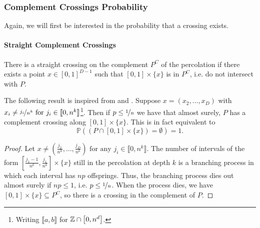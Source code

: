 \subsubsection{Complement Crossings Probability}
Again, we will first be interested in the probability that a crossing exists.

\paragraph{Straight Complement Crossings}
There is a straight crossing on the complement $P^C$ of the percolation if there exists a point $x \in \left[ 0,1 \right]^{D-1}$ such that $\left[ 0,1 \right] \times \{ x \}$  is in $P^C$, i.e. do not intersect with $P$.

The following result is inspired from \cite[p.309 b.(1)]{Chayes_1988} and \cite[p.215]{Mandelbrot_1982}.
Suppose $x = (x_2,\dots,x_D)$ with $x_i \neq \nicefrac{j_i}{n^k} \text{ for } j_i \in \llbracket 0,n^k \rrbracket$\footnote{Writing $\llbracket a,b \rrbracket$ for $\mathbb{Z} \cap \left[ 0,n^d \right]$.}.
Then if $p \leq \nicefrac{1}{n}$ we have that almost surely, $P$ has a complement crossing along $\left[ 0,1 \right] \times \{ x \}$.
This is in fact equivalent to 
$$\mathbb{P}\left( \left( P \cap \left[ 0,1 \right] \times \{ x \} \right) = \emptyset \right) = 1 .$$
\begin{proof}
	Let $x \neq \left( \frac{j_2}{n^k},\dots,\frac{j_D}{n^k} \right) \text{ for any } j_i \in \llbracket 0,n^k \rrbracket$.
	The number of intervals of the form $\left[ \frac{j_1-1}{n^k},\frac{j_1}{n^k} \right] \times \{ x \}$ still in the percolation at depth $k$ is a branching process in which each interval has $np$ offsprings.
	Thus, the branching process dies out almost surely if $np \leq 1$, i.e. $p \leq \nicefrac{1}{n}$.
	When the process dies, we have $\left[ 0,1 \right] \times \{ x \} \subseteq P^C$, so there is a crossing in the complement of $P$.
\end{proof}

